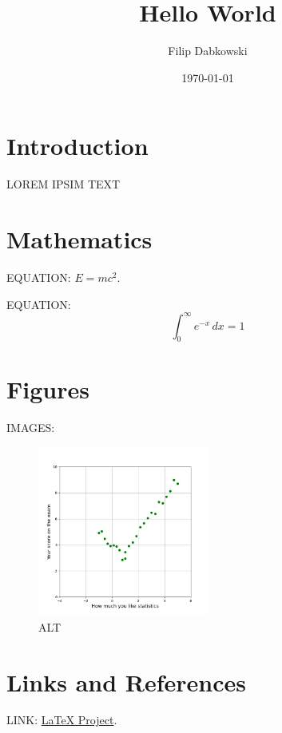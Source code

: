 \documentclass{article}
\title{Hello World}
\author{Filip Dabkowski}
\date{\today}
\begin{document}
\maketitle

\section{Introduction}
LOREM IPSIM TEXT

\section{Mathematics}
EQUATION: $E = mc^2$.

EQUATION:
\begin{equation}
    \int_0^\infty e^{-x} \,dx = 1
\end{equation}

\section{Figures}
IMAGES:
\begin{figure}[h]
    \centering
    \includegraphics[width=0.5\textwidth]{../images/myplot.png}
    \caption{ALT}
    \label{fig:example}
\end{figure}

\section{Links and References}
LINK: \href{https://www.latex-project.org}{LaTeX Project}.
\end{document}
